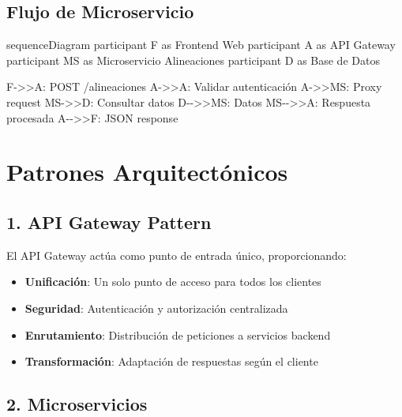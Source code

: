 \documentclass[
  spanish,
  11pt,
  letterpaper,
]{book}
\newenvironment{Shaded}{\begin{snugshade}}{\end{snugshade}}
\newcommand{\NormalTok}[1]{\textcolor[rgb]{0.00,0.23,0.31}{#1}}
\providecommand{\tightlist}{%
  \setlength{\itemsep}{0pt}\setlength{\parskip}{0pt}}
\begin{document}
\subsection{Flujo de Microservicio}\label{flujo-de-microservicio}

\begin{Shaded}
\begin{Highlighting}[]
\NormalTok{sequenceDiagram}
\NormalTok{    participant F as Frontend Web}
\NormalTok{    participant A as API Gateway}
\NormalTok{    participant MS as Microservicio Alineaciones}
\NormalTok{    participant D as Base de Datos}
    
\NormalTok{    F{-}\textgreater{}\textgreater{}A: POST /alineaciones}
\NormalTok{    A{-}\textgreater{}\textgreater{}A: Validar autenticación}
\NormalTok{    A{-}\textgreater{}\textgreater{}MS: Proxy request}
\NormalTok{    MS{-}\textgreater{}\textgreater{}D: Consultar datos}
\NormalTok{    D{-}{-}\textgreater{}\textgreater{}MS: Datos}
\NormalTok{    MS{-}{-}\textgreater{}\textgreater{}A: Respuesta procesada}
\NormalTok{    A{-}{-}\textgreater{}\textgreater{}F: JSON response}
\end{Highlighting}
\end{Shaded}

\section{Patrones Arquitectónicos}\label{patrones-arquitectuxf3nicos}

\subsection{1. API Gateway Pattern}\label{api-gateway-pattern}

El API Gateway actúa como punto de entrada único, proporcionando:

\begin{itemize}
\tightlist
\item
  \textbf{Unificación}: Un solo punto de acceso para todos los clientes
\item
  \textbf{Seguridad}: Autenticación y autorización centralizada
\item
  \textbf{Enrutamiento}: Distribución de peticiones a servicios backend
\item
  \textbf{Transformación}: Adaptación de respuestas según el cliente
\end{itemize}

\subsection{2. Microservicios}\label{microservicios}
\end{document}
